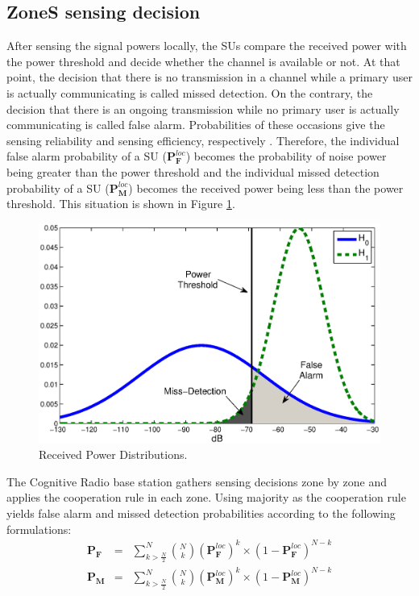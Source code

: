 \documentclass[conference,compsoc]{IEEEtran}
\newcommand{\probf}{\mathbf{P_F}}
\newcommand{\probm}{\mathbf{P_M}}
\newcommand{\probmlocal}{\mathbf{P}_\mathbf{M}^{loc}}
\newcommand{\probflocal}{\mathbf{P}_\mathbf{F}^{loc}}
\newcommand{\CR}{Cognitive Radio }
\begin{document}
\subsection{ZoneS sensing decision}
After sensing the signal powers locally, the SUs compare the received power with the power threshold and decide whether the channel is available or not. At that point, the decision that there is no transmission in a channel while a primary user is actually communicating is called missed detection. On the contrary, the decision that there is an ongoing transmission while no primary user is actually communicating is called false alarm. Probabilities of these occasions give the sensing reliability and sensing efficiency, respectively \cite{UpToDateSensing}. Therefore, the individual false alarm probability of a SU ($\probflocal$) becomes the probability of noise power being greater than the power threshold and the individual missed detection probability of a SU ($\probmlocal$) becomes the received power being less than the power threshold. This situation is shown in Figure \ref{fig:h0h1}.
\begin{figure}[!htb]
\centering
\includegraphics[width=0.99\columnwidth,keepaspectratio] {figs/h0_h1.eps}
\caption{Received Power Distributions.}
\label{fig:h0h1}
\end{figure}

The \CR base station gathers sensing decisions zone by zone and applies the cooperation rule in each zone. Using majority as the cooperation rule yields false alarm and missed detection probabilities according to the following formulations:
\begin{equation}
    \begin{array}{lcl}
        \probf & = & \sum\limits_{ k > \frac{N}{2}}^N {N \choose k}(\probflocal)^k\times(1-\probflocal)^{N-k} \\
        \probm & = & \sum\limits_{ k > \frac{N}{2}}^N {N \choose k}(\probmlocal)^k\times(1-\probmlocal)^{N-k}
    \end{array}
\end{equation}
\end{document}
